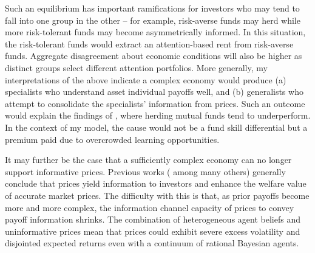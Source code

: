 \documentclass{article}
\begin{document}
Such an equilibrium has important ramifications for investors who may tend to fall into one group in the other -- for example, risk-averse funds may herd while more risk-tolerant funds may become asymmetrically informed. In this situation, the risk-tolerant funds would extract an attention-based rent from risk-averse funds. Aggregate disagreement about economic conditions will also be higher as distinct groups select different attention portfolios. More generally, my interpretations of the above indicate a complex economy would produce (a) specialists who understand asset individual payoffs well, and (b) generalists who attempt to consolidate the specialists' information from prices. Such an outcome would explain the findings of \textcite{jiang_does_2018}, where herding mutual funds tend to underperform. In the context of my model, the cause would not be a fund skill differential but a premium paid due to overcrowded learning opportunities.

It may further be the case that a sufficiently complex economy can no longer support informative prices. Previous works (\textcite{admati_noisy_1985, hellwig1980, kacperczyk_rational_2016} among many others) generally conclude that prices yield information to investors and enhance the welfare value of accurate market prices. The difficulty with this is that, as prior payoffs become more and more complex, the information channel capacity of prices to convey payoff information shrinks. The combination of heterogeneous agent beliefs and uninformative prices mean that prices could exhibit severe excess volatility and disjointed expected returns even with a continuum of rational Bayesian agents. 
\end{document}
